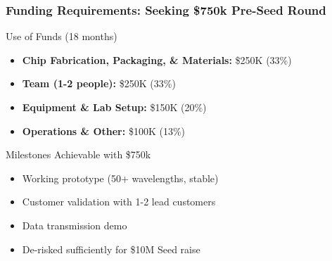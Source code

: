 \documentclass{beamer}
\begin{document}
\begin{frame}
    \frametitle{Funding Requirements: Seeking \$750k Pre-Seed Round}
    
    \begin{block}{Use of Funds (18 months)}
        \begin{itemize}
            \item \textbf{Chip Fabrication, Packaging, \& Materials:} \$250K (33\%)
            \item \textbf{Team (1-2 people):} \$250K (33\%)
            \item \textbf{Equipment \& Lab Setup:} \$150K (20\%)
            \item \textbf{Operations \& Other:} \$100K (13\%)
        \end{itemize}
    \end{block}
    
    \begin{exampleblock}{Milestones Achievable with \$750k}
        \begin{itemize}
            \item Working prototype (50+ wavelengths, stable)
            \item Customer validation with 1-2 lead customers
            \item Data transmission demo
            \item De-risked sufficiently for \$10M Seed raise
        \end{itemize}
    \end{exampleblock}
\end{frame}
\end{document}
